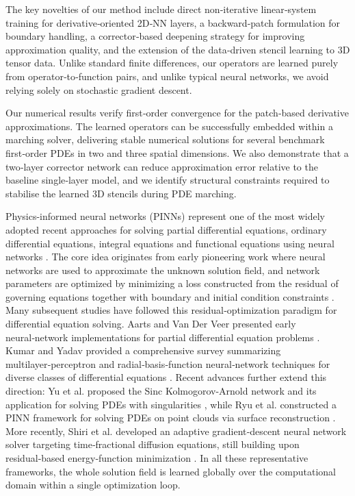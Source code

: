 \documentclass[pdflatex,sn-mathphys-num]{sn-jnl}%
\theoremstyle{thmstyleone}%
\theoremstyle{thmstyletwo}%
\theoremstyle{thmstylethree}%
\begin{document}
The key novelties of our method include direct non‑iterative linear‑system training for derivative‑oriented 2D‑NN layers, a backward‑patch formulation for boundary handling, a corrector‑based deepening strategy for improving approximation quality, and the extension of the data‑driven stencil learning to 3D tensor data. Unlike standard finite differences, our operators are learned purely from operator‑to‑function pairs, and unlike typical neural networks, we avoid relying solely on stochastic gradient descent.

Our numerical results verify first‑order convergence for the patch‑based derivative approximations. The learned operators can be successfully embedded within a marching solver, delivering stable numerical solutions for several benchmark first‑order PDEs in two and three spatial dimensions. We also demonstrate that a two‑layer corrector network can reduce approximation error relative to the baseline single‑layer model, and we identify structural constraints required to stabilise the learned 3D stencils during PDE marching.

Physics-informed neural networks (PINNs) represent one of the most widely adopted recent approaches for solving partial differential equations, ordinary differential equations, integral equations and functional equations using neural networks \cite{raissi2019physics}. The core idea originates from early pioneering work where neural networks are used to approximate the unknown solution field, and network parameters are optimized by minimizing a loss constructed from the residual of governing equations together with boundary and initial condition constraints \cite{lagaris1998artificial}. Many subsequent studies have followed this residual‑optimization paradigm for differential equation solving. Aarts and Van Der Veer presented early neural‑network implementations for partial differential equation problems \cite{aarts2001neural}. Kumar and Yadav provided a comprehensive survey summarizing multilayer‑perceptron and radial‑basis‑function neural‑network techniques for diverse classes of differential equations \cite{kumar2011multilayer}. 
Recent advances further extend this direction: Yu et al. proposed the Sinc Kolmogorov-Arnold network and its application for solving PDEs with singularities \cite{Yu2026}, while Ryu et al. constructed a PINN framework for solving PDEs on point clouds via surface reconstruction \cite{Ryu2025}.
 More recently, Shiri et al. developed an adaptive gradient‑descent neural network solver targeting time‑fractional diffusion equations, still building upon residual‑based energy‑function minimization \cite{shiri2022adaptive}. In all these representative frameworks, the whole solution field is learned globally over the computational domain within a single optimization loop.
\end{document}
